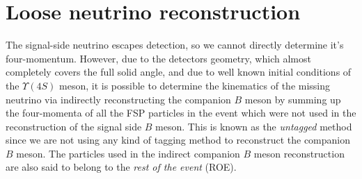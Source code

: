 \section{Loose neutrino reconstruction}\label{sec:loose-neutrino-reconstruction}

%


The signal-side neutrino escapes detection, so we cannot directly determine it's four-momentum. However, due to the detectors geometry, which almost completely covers the full solid angle, and due to well known initial conditions of the $\Upsilon(4S)$ meson, it is possible to determine the kinematics of the missing neutrino via indirectly reconstructing the companion $B$ meson by summing up the four-momenta of all the FSP particles in the event which were not used in the reconstruction of the signal side $B$ meson. This is known as the \textit{untagged} method since we are not using any kind of tagging method to reconstruct the companion $B$ meson. The particles used in the indirect companion $B$ meson reconstruction are also said to belong to the \textit{rest of the event} (ROE).

